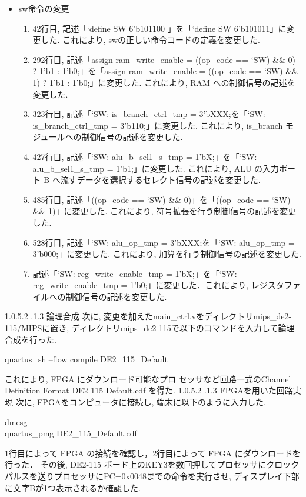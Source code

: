 \documentclass[epsf,a4paper,dvipdfmx,autodetect-engine,titlepage]{jsarticle}
\makeatletter
\newcommand{\subsubsubsection}
{\@startsection{paragraph}{4}{\z@}%
{1.0\Cvs \@plus.5\Cdp \@minus.2\Cdp}%
{.1\Cvs \@plus.3\Cdp}%
{\reset@font\sffamily\normalsize}}
\makeatother
\begin{document}
\begin{itemize}
\begin{enumerate}
    \item 756行目, 記述「`ADDIU:  link\_tmp = 1'bX;」を「`ADDIU:  link\_tmp = 1'b0;」に変更した. これにより, レジスタファイルの write\_idx へ流すデータを選択するセレクト信号の記述を変更した.
\end{enumerate}
    \item sw命令の変更
\begin{enumerate}
    \item 42行目, 記述「`define     SW  6'b101100 」を「`define     SW  6'b101011」に変更した. これにより, swの正しい命令コードの定義を変更した.
    
    \item 292行目, 記述「assign  ram\_write\_enable = ((op\_code == `SW) \&\& 0) ? 1'b1 : 1'b0;」を「assign  ram\_write\_enable = ((op\_code == `SW) \&\& 1) ? 1'b1 : 1'b0;」に変更した. これにより, RAM への制御信号の記述を変更した.
    
    \item 323行目, 記述「`SW:     is\_branch\_ctrl\_tmp = 3'bXXX;を「`SW:     is\_branch\_ctrl\_tmp = 3'b110;」に変更した. これにより, is\_branch モジュールへの制御信号の記述を変更した.    
    
    \item 427行目, 記述「`SW:     alu\_b\_sel1\_s\_tmp = 1'bX;」を「`SW:     alu\_b\_sel1\_s\_tmp = 1'b1;」に変更した. これにより, ALU の入力ポート B へ流すデータを選択するセレクト信号の記述を変更した.
    
    \item 485行目, 記述「((op\_code == `SW) \&\& 0)」を「((op\_code == `SW) \&\& 1)」に変更した. これにより, 符号拡張を行う制御信号の記述を変更した.
    
    \item 528行目, 記述「`SW:     alu\_op\_tmp = 3'bXXX;を「`SW:     alu\_op\_tmp = 3'b000;」に変更した. これにより, 加算を行う制御信号の記述を変更した.
    
    \item 記述「`SW:     reg\_write\_enable\_tmp = 1'bX;」を「`SW:     reg\_write\_enable\_tmp = 1'b0;」に変更した．これにより, レジスタファイルへの制御信号の記述を変更した.
\end{enumerate}
\end{itemize}
\subsubsubsection{論理合成}
次に, 変更を加えたmain\_ctrl.vをディレクトリmips\_de2-115/MIPSに置き, ディレクトリmips\_de2-115で以下のコマンドを入力して論理合成を行った.
\begin{screen}
quartus\_sh --flow compile DE2\_115\_Default
\end{screen}
これにより,  FPGA にダウンロード可能なプロ
セッサなど回路一式のChannel Definition Format DE2 115 Default.cdf を得た.
\subsubsubsection{FPGAを用いた回路実現}
次に, FPGAをコンピュータに接続し, 端末に以下のように入力した.
\begin{screen}
dmesg \\
quartus\_pmg DE2\_115\_Default.cdf
\end{screen}
1行目によって FPGA の接続を確認し，2行目によって FPGA にダウンロードを行った．
その後, DE2-115 ボード上のKEY3を数回押してプロセッサにクロックパルスを送りプロセッサにPC=0x0048までの命令を実行させ, ディスプレイ下部に文字Bが1つ表示されるか確認した.
\end{document}
